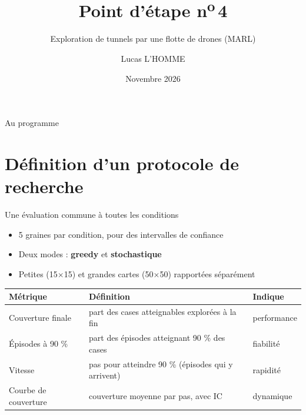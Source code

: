 \documentclass[aspectratio=169,11pt]{beamer}
\title{Point d'étape n\textsuperscript{o}\,4}
\subtitle{Exploration de tunnels par une flotte de drones (MARL)}
\author{Lucas L'HOMME}
\date{Novembre 2026}
\begin{document}
\maketitle

\begin{frame}{Au programme}
  \tableofcontents[hideallsubsections]
\end{frame}

\section{Définition d'un protocole de recherche}

\begin{frame}{Une évaluation commune à toutes les conditions}
  \small
  \begin{itemize}
    \item 5 graines par condition, pour des intervalles de confiance
    \item Deux modes : \textbf{greedy} et \textbf{stochastique}
    \item Petites (15$\times$15) et grandes cartes (50$\times$50) rapportées séparément
  \end{itemize}

  \vspace{0.3em}
  \centering
  \begin{tabular}{lp{7.4cm}l}
    \toprule
    Métrique & Définition & Indique \\
    \midrule
    Couverture finale & part des cases atteignables explorées à la fin & performance \\
    Épisodes à 90 \% & part des épisodes atteignant 90 \% des cases & fiabilité \\
    Vitesse & pas pour atteindre 90 \% (épisodes qui y arrivent) & rapidité \\
    Courbe de couverture & couverture moyenne par pas, avec IC & dynamique \\
    \bottomrule
  \end{tabular}
\end{frame}
\end{document}
